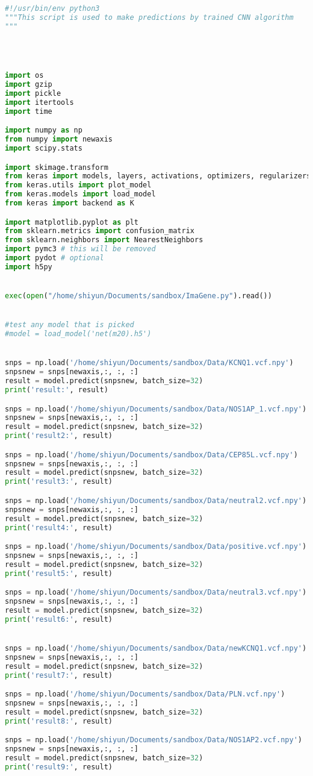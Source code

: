 \begin{lstlisting}[language=Python,breaklines]
#!/usr/bin/env python3
"""This script is used to make predictions by trained CNN algorithm
"""




import os
import gzip
import pickle
import itertools
import time

import numpy as np
from numpy import newaxis 
import scipy.stats

import skimage.transform
from keras import models, layers, activations, optimizers, regularizers
from keras.utils import plot_model
from keras.models import load_model
from keras import backend as K

import matplotlib.pyplot as plt
from sklearn.metrics import confusion_matrix
from sklearn.neighbors import NearestNeighbors
import pymc3 # this will be removed
import pydot # optional
import h5py 


exec(open("/home/shiyun/Documents/sandbox/ImaGene.py").read())


#test any model that is picked
#model = load_model('net(m20).h5')


snps = np.load('/home/shiyun/Documents/sandbox/Data/KCNQ1.vcf.npy')
snpsnew = snps[newaxis,:, :, :]
result = model.predict(snpsnew, batch_size=32)
print('result:', result)

snps = np.load('/home/shiyun/Documents/sandbox/Data/NOS1AP_1.vcf.npy')
snpsnew = snps[newaxis,:, :, :]
result = model.predict(snpsnew, batch_size=32)
print('result2:', result)

snps = np.load('/home/shiyun/Documents/sandbox/Data/CEP85L.vcf.npy')
snpsnew = snps[newaxis,:, :, :]
result = model.predict(snpsnew, batch_size=32)
print('result3:', result)

snps = np.load('/home/shiyun/Documents/sandbox/Data/neutral2.vcf.npy')
snpsnew = snps[newaxis,:, :, :]
result = model.predict(snpsnew, batch_size=32)
print('result4:', result)

snps = np.load('/home/shiyun/Documents/sandbox/Data/positive.vcf.npy')
snpsnew = snps[newaxis,:, :, :]
result = model.predict(snpsnew, batch_size=32)
print('result5:', result)

snps = np.load('/home/shiyun/Documents/sandbox/Data/neutral3.vcf.npy')
snpsnew = snps[newaxis,:, :, :]
result = model.predict(snpsnew, batch_size=32)
print('result6:', result)


snps = np.load('/home/shiyun/Documents/sandbox/Data/newKCNQ1.vcf.npy')
snpsnew = snps[newaxis,:, :, :]
result = model.predict(snpsnew, batch_size=32)
print('result7:', result)

snps = np.load('/home/shiyun/Documents/sandbox/Data/PLN.vcf.npy')
snpsnew = snps[newaxis,:, :, :]
result = model.predict(snpsnew, batch_size=32)
print('result8:', result)

snps = np.load('/home/shiyun/Documents/sandbox/Data/NOS1AP2.vcf.npy')
snpsnew = snps[newaxis,:, :, :]
result = model.predict(snpsnew, batch_size=32)
print('result9:', result)
\end{lstlisting}